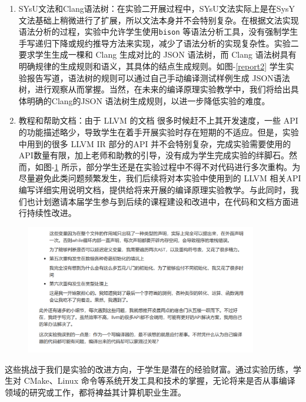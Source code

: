 \documentclass{SCIS2020cn}
\begin{document}
\begin{enumerate}
    \item SYsU文法和Clang语法树：在实验二开展过程中，SYsU文法实际上是在SysY文法基础上稍微进行了扩展，所以文法本身并不会特别复杂。在根据文法实现语法分析的过程，实验中允许学生使用\texttt{bison} 等语法分析工具，没有强制学生手写递归下降或规约推导方法来实现，减少了语法分析的实现复杂性。实验二要求学生生成一棵和 Clang 生成对比的 JSON 语法树，而 Clang 语法树具有明确规律的生成规则和语义，其具体的结点生成规则。如图-\ref{report2} 学生实验报告写道，语法树的规则可以通过自己手动编译测试样例生成 JSON语法树，进行观察从而掌握。当然，在未来的编译原理实验教学中，我们将给出具体明确的Clang的JSON 语法树生成规则，以进一步降低实验的难度。
    \item 教程和帮助文档：由于 LLVM 的文档 \cite{llvm_newpass} 很多时候赶不上其开发速度，一些 API 的功能描述略少，导致学生在着手开展实验时存在短期的不适应。但是，实验中用到的很多 LLVM IR 部分的API 并不会特别复杂，完成实验需要使用的API数量有限，加上老师和助教的引导，没有成为学生完成实验的绊脚石。然而，如图-\ref{complain} 所示，部分学生还是在实验过程中不得不对代码进行多次重构。为尽量避免此类问题频繁发生，我们后续将对本实验中使用到的 LLVM 相关API编写详细实用说明文档，提供给将来开展的编译原理实验教学。与此同时，我们也计划邀请本届学生参与到后续的课程建设和改进中，在代码和文档方面进行持续性改进。
\end{enumerate}

\begin{figure}
    \centering
    \includegraphics[width=0.9\textwidth]{assets/image/report}
    \label{complain}
\end{figure}

这些挑战于我们是实验的改进方向，于学生是潜在的经验财富。通过实验历练，学生对 CMake、Linux 命令等系统开发工具和技术的掌握，无论将来是否从事编译领域的研究或工作，都将裨益其计算机职业生涯。
\end{document}
